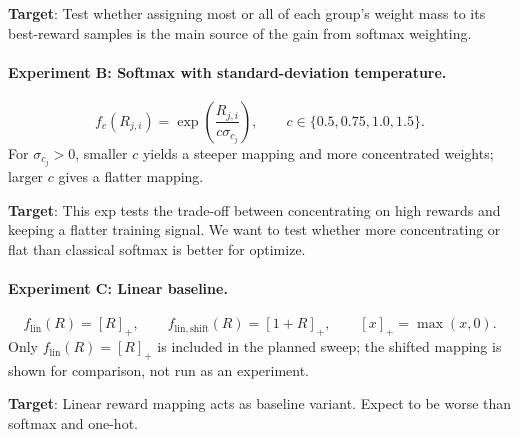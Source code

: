 \documentclass{article} %
\begin{document}
\textbf{Target}: Test whether assigning most or all of each group's weight
mass to its best-reward samples is the main source of the gain from
softmax weighting.

\paragraph{Experiment B: Softmax with standard-deviation temperature.}

\[
f_c(R_{j,i})=\exp\!\left(\frac{R_{j,i}}{c\sigma_{c_j}}\right),
\qquad c\in\{0.5,0.75,1.0,1.5\}.
\]
For \(\sigma_{c_j}>0\), smaller \(c\) yields a steeper mapping and more
concentrated weights; larger \(c\) gives a flatter mapping.

\textbf{Target}: This exp tests
the trade-off between concentrating on high rewards and keeping a flatter
training signal. We want to test whether more concentrating or flat than classical softmax is better for optimize.

\paragraph{Experiment C: Linear baseline.}
\[
f_{\mathrm{lin}}(R)=[R]_+,
\qquad
f_{\mathrm{lin,shift}}(R)=[1+R]_+,
\qquad [x]_+=\max(x,0).
\]
Only \(f_{\mathrm{lin}}(R)=[R]_+\) is included in the planned sweep;
the shifted mapping is shown for comparison, not run as an experiment.

\textbf{Target}: Linear reward mapping acts as baseline variant. Expect to be worse than softmax and one-hot.
\end{document}
